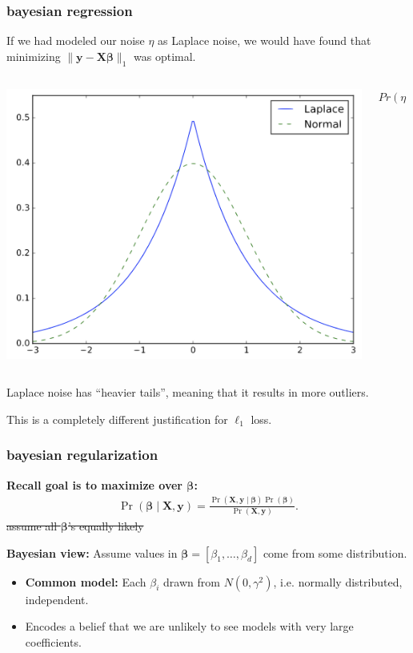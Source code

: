 \documentclass[handout,compress]{beamer}
\newcommand{\bs}[1]{\boldsymbol{#1}}
\newcommand{\bv}[1]{\mathbf{#1}}
\begin{document}
\begin{frame}
	\frametitle{bayesian regression}
		If we had modeled our noise $\eta$ as Laplace noise, we would have found that minimizing $\|\bv{y} - \bv{X}\bs{\beta}\|_1$ was optimal.
		
		\vspace{1em}
		\begin{columns}
			\begin{column}{.5\textwidth}
				\hspace{2em}\includegraphics[width=.9\textwidth]{laplacen.png}
			\end{column}
			\begin{column}{.5\textwidth}
				$Pr(\eta = z) \sim$
			\end{column}
		\end{columns}
	
	Laplace noise has ``heavier tails'', meaning that it results in more outliers.
	
	\alert{This is a completely different justification for $\ell_1$ loss.}
\end{frame}

\begin{frame}
	\frametitle{bayesian regularization}
	\begin{center}
	\textbf{Recall goal is to maximize over $\bs{\beta}$:}
	\begin{align*}
		\Pr(\bs{\beta} \mid \bv{X},\bv{y} )  = \frac{\Pr(\bv{X},\bv{y} \mid  \bs{\beta} ) \Pr(\bs{\beta} )  }{\Pr(\bv{X},\bv{y} )}.
	\end{align*}
	\sout{assume all $\bs{\beta}$'s equally likely}	
	
	\textbf{Bayesian view:} Assume values in $\bs{\beta} = [\beta_1, \ldots, \beta_d]$ come from some distribution. 
	\end{center}

\begin{itemize}
	\item \textbf{Common model:} Each $\beta_i$ drawn from $N(0,\gamma^2)$, i.e. normally distributed, independent.
	\item Encodes a belief that we are unlikely to see models with very large coefficients. 
\end{itemize}
\end{frame}
\end{document}
